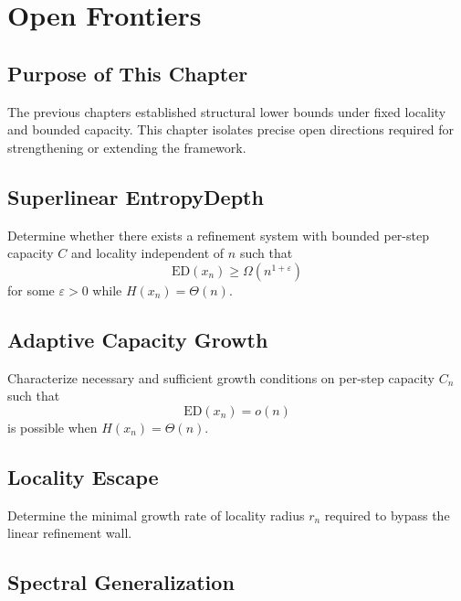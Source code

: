 \chapter{Open Frontiers}

\section*{Purpose of This Chapter}

The previous chapters established structural lower bounds under fixed locality and bounded capacity.  
This chapter isolates precise open directions required for strengthening or extending the framework.

\section{Superlinear EntropyDepth}

\begin{problem}
Determine whether there exists a refinement system with bounded per-step capacity $C$ and locality independent of $n$ such that
\[
\mathrm{ED}(x_n) \ge \Omega(n^{1+\varepsilon})
\]
for some $\varepsilon>0$ while $H(x_n)=\Theta(n)$.
\end{problem}

\section{Adaptive Capacity Growth}

\begin{problem}
Characterize necessary and sufficient growth conditions on per-step capacity $C_n$ such that
\[
\mathrm{ED}(x_n) = o(n)
\]
is possible when $H(x_n)=\Theta(n)$.
\end{problem}

\section{Locality Escape}

\begin{problem}
Determine the minimal growth rate of locality radius $r_n$ required to bypass the linear refinement wall.
\end{problem}

\section{Spectral Generalization}


